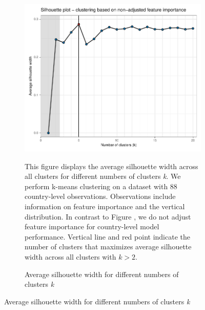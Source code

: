 \begin{figure}[ht!]\ContinuedFloat
   \centering
   \begin{subfigure}[b]{\textwidth}
   \centering
   \includegraphics{Figures_Appendix/Figure_Silhouette_1.pdf}
   \caption{Average silhouette width for different numbers of clusters \textit{k}} \label{fig:G1_silhouette}
   \begin{subcaption2}
     This figure displays the average silhouette width across all clusters for different numbers of clusters \textit{k}. We perform k-means clustering on a dataset with 88 country-level observations. Observations include information on feature importance and the vertical distribution. In contrast to Figure , we do not adjust feature importance for country-level model performance. Vertical line and red point indicate the number of clusters that maximizes average silhouette width across all clusters with $k>2$.
   \end{subcaption2}
   \end{subfigure}
 \end{figure}

 \clearpage

